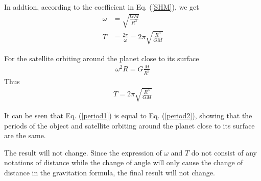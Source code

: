 \documentclass[12pt,a4paper]{article}
\begin{document}
In addtion, according to the coefficient in Eq. (\ref{SHM}), we get
\begin{align}
	\omega &= \sqrt{\frac{GM}{R^3}}\\
	T &= \frac{2\pi}{\omega} = 2\pi \sqrt{\frac{R^3}{GM}}
	\label{period1}
\end{align}

For the satellite orbiting around the planet close to its surface
\begin{align}
	\omega^2 R = G\frac{M}{R^2}
\end{align}
Thus
\begin{align}
	T = 2\pi \sqrt{\frac{R^3}{GM}}
	\label{period2}
\end{align}

It can be seen that Eq. (\ref{period1}) is equal to Eq. (\ref{period2}), showing that the periods of the object and satellite orbiting around the planet close to its surface are the same.

The result will not change. Since the expression of $\omega$ and $T$ do not consist of any notations of distance while the change of angle will only cause the change of distance in the gravitation formula, the final result will not change.
\end{document}
